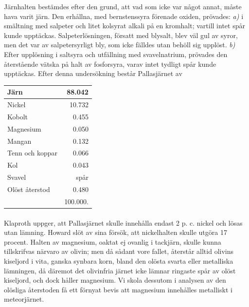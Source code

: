\documentclass[a4paper, 12pt, oneside, swedish]{article}
\begin{document}
Järnhalten bestämdes efter den grund, att vad som icke var något annat, måste hava varit järn. Den erhållna, med bernstenssyra förenade oxiden, prövades: \emph{a)} i smältning med salpeter och litet kolsyrat alkali på en kromhalt; vartill intet spår kunde upptäckas. Salpeterlösningen, försatt med blysalt, blev väl gul av syror, men det var av salpetersyrligt bly, som icke fälldes utan behöll sig upplöst. \emph{b)} Efter upplösning i saltsyra och utfällning med svavelnatrium, prövades den återstående vätska på halt av fosforsyra, varav intet tydligt spår kunde upptäckas. Efter denna undersökning består Pallasjärnet av
\begin{table}[H]
    \centering\small
    \begin{tabular}{|l|r|}
    \hline
        Järn & 88.042 \\ \hline
        Nickel & 10.732 \\ \hline
        Kobolt & 0.455 \\ \hline
        Magnesium & 0.050 \\ \hline
        Mangan & 0.132 \\ \hline
        Tenn och koppar & 0.066 \\ \hline
        Kol & 0.043 \\ \hline
        Svavel & spår \\ \hline
        Olöst återstod & 0.480 \\ \hline
        ~ & 100.000. \\ \hline
    \end{tabular}
\end{table}
\paragraph{}
Klaproth uppger, att Pallasjärnet skulle innehålla endast 2 p. c. nickel och lösas utan lämning. Howard slöt av sina försök, att nickelhalten skulle utgöra 17 procent. Halten av magnesium, oaktat ej ovanlig i tackjärn, skulle kunna tillskrifvas närvaro av olivin; men då sådant vore fallet, återstår alltid olivins kiseljord i vita, ganska synbara korn, bland den olösta svarta eller metalliska lämningen, då däremot det olivinfria järnet icke lämnar ringaste spår av olöst kiseljord, och dock håller magnesium. Vi skola dessutom i analysen av den olösliga återstoden få ett förnyat bevis att magnesium innehålles metalliskt i meteorjärnet.
\end{document}
